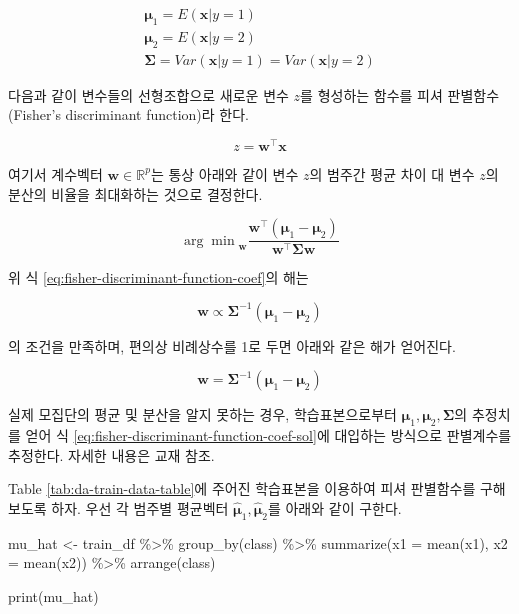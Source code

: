 \documentclass[
]{book}
\newenvironment{Shaded}{\begin{snugshade}}{\end{snugshade}}
\newcommand{\AttributeTok}[1]{\textcolor[rgb]{0.77,0.63,0.00}{#1}}
\newcommand{\FunctionTok}[1]{\textcolor[rgb]{0.00,0.00,0.00}{#1}}
\newcommand{\NormalTok}[1]{#1}
\newcommand{\OtherTok}[1]{\textcolor[rgb]{0.56,0.35,0.01}{#1}}
\newcommand{\SpecialCharTok}[1]{\textcolor[rgb]{0.00,0.00,0.00}{#1}}
\begin{document}
\begin{eqnarray*}
\boldsymbol\mu_1 = E(\mathbf{x} | y = 1)\\
\boldsymbol\mu_2 = E(\mathbf{x} | y = 2)\\
\boldsymbol\Sigma = Var(\mathbf{x} | y = 1) = Var(\mathbf{x} | y = 2)
\end{eqnarray*}

다음과 같이 변수들의 선형조합으로 새로운 변수 \(z\)를 형성하는 함수를 피셔 판별함수(Fisher's discriminant function)라 한다.

\begin{equation}
z = \mathbf{w}^\top \mathbf{x} \label{eq:fisher-discriminant-function}
\end{equation}

여기서 계수벡터 \(\mathbf{w} \in \mathbb{R}^p\)는 통상 아래와 같이 변수 \(z\)의 범주간 평균 차이 대 변수 \(z\)의 분산의 비율을 최대화하는 것으로 결정한다.

\begin{equation}
{\arg\!\min}_{\mathbf{w}} \frac{\mathbf{w}^\top ( \boldsymbol\mu_1 - \boldsymbol\mu_2 )}{\mathbf{w}^\top \boldsymbol\Sigma \mathbf{w}} \label{eq:fisher-discriminant-function-coef}
\end{equation}

위 식 \eqref{eq:fisher-discriminant-function-coef}의 해는

\begin{equation*}
\mathbf{w} \propto \boldsymbol\Sigma^{-1}(\boldsymbol\mu_1 - \boldsymbol\mu_2)
\end{equation*}

의 조건을 만족하며, 편의상 비례상수를 1로 두면 아래와 같은 해가 얻어진다.

\begin{equation}
\mathbf{w} = \boldsymbol\Sigma^{-1}(\boldsymbol\mu_1 - \boldsymbol\mu_2) \label{eq:fisher-discriminant-function-coef-sol}
\end{equation}

실제 모집단의 평균 및 분산을 알지 못하는 경우, 학습표본으로부터 \(\boldsymbol\mu_1, \boldsymbol\mu_2, \boldsymbol\Sigma\)의 추정치를 얻어 식 \eqref{eq:fisher-discriminant-function-coef-sol}에 대입하는 방식으로 판별계수를 추정한다. 자세한 내용은 교재 \citep{jun2012datamining} 참조.

Table \ref{tab:da-train-data-table}에 주어진 학습표본을 이용하여 피셔 판별함수를 구해보도록 하자. 우선 각 범주별 평균벡터 \(\hat{\boldsymbol\mu}_1, \hat{\boldsymbol\mu}_2\)를 아래와 같이 구한다.

\begin{Shaded}
\begin{Highlighting}[]
\NormalTok{mu\_hat }\OtherTok{\textless{}{-}}\NormalTok{ train\_df }\SpecialCharTok{\%\textgreater{}\%} 
  \FunctionTok{group\_by}\NormalTok{(class) }\SpecialCharTok{\%\textgreater{}\%}
  \FunctionTok{summarize}\NormalTok{(}\AttributeTok{x1 =} \FunctionTok{mean}\NormalTok{(x1),}
            \AttributeTok{x2 =} \FunctionTok{mean}\NormalTok{(x2)) }\SpecialCharTok{\%\textgreater{}\%}
  \FunctionTok{arrange}\NormalTok{(class)}

\FunctionTok{print}\NormalTok{(mu\_hat)}
\end{Highlighting}
\end{Shaded}
\end{document}
